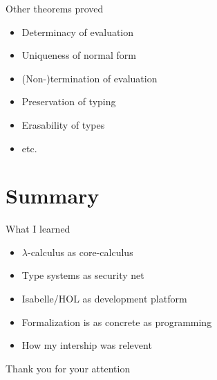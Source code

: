 \documentclass[xcolor=dvipsnames]{beamer}
\begin{document}
\begin{frame}{Other theorems proved}
  \begin{itemize}
    \item Determinacy of evaluation
    \item Uniqueness of normal form
    \item (Non-)termination of evaluation
    \item Preservation of typing
    \item Erasability of types
    \item etc.
  \end{itemize}
\end{frame}

\section*{Summary}

\begin{frame}{What I learned}
  \begin{itemize}
    \item $\lambda$-calculus as core-calculus
    \item Type systems as security net
    \item Isabelle/HOL as development platform
    \item Formalization is as concrete as programming
    \item How my intership was relevent
  \end{itemize}
\end{frame}

\begin{frame}
  \begin{center}
    Thank you for your attention
  \end{center}
\end{frame}
\end{document}
